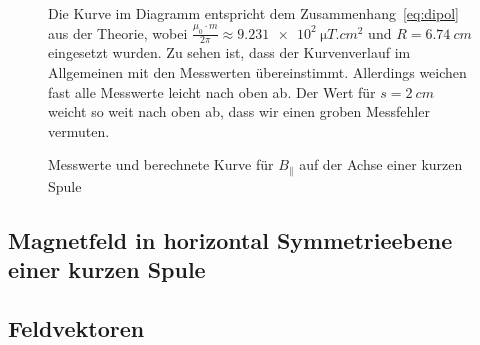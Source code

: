 \begin{figure}[H]
\centering
{}
\caption{Messwerte und berechnete Kurve für $B_\parallel$ auf der Achse einer kurzen Spule}
\label{fig:axialaufachsekurz}

Die Kurve im Diagramm entspricht dem Zusammenhang~\cref{eq:dipol} aus der Theorie, wobei $\frac{\mu_0\cdot m}{2\pi}\approx \SI{9.231e2}{\micro T.cm^2}$ und $R=\SI{6.74}{cm}$ eingesetzt wurden.
Zu sehen ist, dass der Kurvenverlauf im Allgemeinen mit den Messwerten übereinstimmt. Allerdings weichen fast alle Messwerte leicht nach oben ab. Der Wert für $s=\SI{2}{cm}$ weicht so weit nach oben ab, dass wir einen groben Messfehler vermuten.
\end{figure}

\subsection{Magnetfeld in horizontal Symmetrieebene einer kurzen Spule}

\subsection{Feldvektoren}


